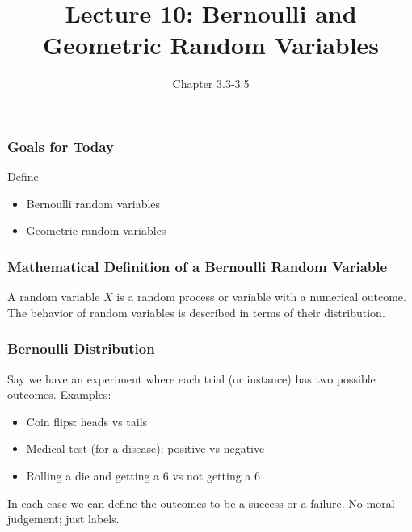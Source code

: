 \documentclass[handout]{beamer}
\title{Lecture 10: Bernoulli and Geometric Random Variables}
\author{Chapter 3.3-3.5}
\date{}
\newcommand{\blue}[1]{\textcolor{blue2}{#1}}
\begin{document}
\begin{frame}
\titlepage
\end{frame}



\begin{frame}[fragile]
\frametitle{Goals for Today}

Define
\begin{itemize}
\item Bernoulli random variables
\item Geometric random variables
\end{itemize}


\end{frame}


\begin{frame}[fragile]
\frametitle{Mathematical Definition of a Bernoulli Random Variable}

A \blue{random variable $X$} is a random process or variable with a numerical outcome.  The behavior of 
random variables is described in terms of their \blue{distribution}.

\end{frame}


\begin{frame}
\frametitle{Bernoulli Distribution}

Say we have an experiment where each \blue{trial} (or instance) has two possible outcomes.  Examples:
\pause\begin{itemize}
\item Coin flips:  heads vs tails
\item Medical test (for a disease):  positive vs negative
\item Rolling a die and getting a 6 vs not getting a 6
\end{itemize}

\vspace{0.5cm}

\pause In each case we can \blue{define} the outcomes to be a \blue{success} or a \blue{failure}.  No moral judgement; just labels.

\end{frame}
\end{document}
